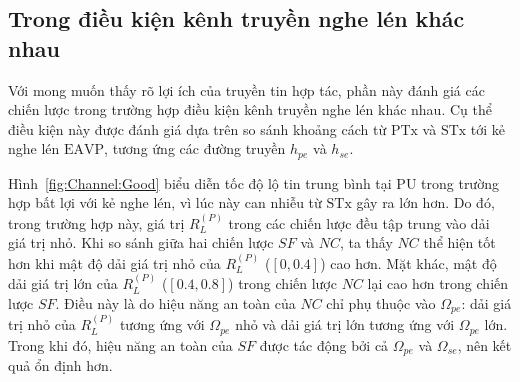 \documentclass[../main.tex]{subfiles}
\begin{document}
\subsection{Trong điều kiện kênh truyền nghe lén khác nhau}

Với mong muốn thấy rõ lợi ích của truyền tin hợp tác, phần này đánh giá các chiến lược trong trường hợp điều kiện kênh truyền nghe lén khác nhau. Cụ thể điều kiện này được đánh giá dựa trên so sánh khoảng cách từ $\text{PTx}$ và $\text{STx}$ tới kẻ nghe lén $\text{EAVP}$, tương ứng các đường truyền $h_{pe}$ và $h_{se}$. 

Hình~\ref{fig:Channel:Good} biểu diễn tốc độ lộ tin trung bình tại PU trong trường hợp bất lợi với kẻ nghe lén, vì lúc này can nhiễu từ $\text{STx}$ gây ra lớn hơn. Do đó, trong trường hợp này, giá trị $R_L^{(P)}$ trong các chiến lược đều tập trung vào dải giá trị nhỏ. Khi so sánh giữa hai chiến lược $SF$ và $NC$, ta thấy $NC$ thể hiện tốt hơn khi mật độ dải giá trị nhỏ của $R_L^{(P)}$ ($\left[0, 0.4\right]$) cao hơn. Mặt khác, mật độ dải giá trị lớn của $R_L^{(P)}$ ($\left[0.4, 0.8\right]$) trong chiến lược $NC$ lại cao hơn trong chiến lược $SF$. Điều này là do hiệu năng an toàn của $NC$ chỉ phụ thuộc vào $\Omega_{pe}$: dải giá trị nhỏ của $R_L^{(P)}$ tương ứng với $\Omega_{pe}$ nhỏ và dải giá trị lớn tương ứng với $\Omega_{pe}$ lớn. Trong khi đó, hiệu năng an toàn của $SF$ được tác động bởi cả $\Omega_{pe}$ và $\Omega_{se}$, nên kết quả ổn định hơn.
\end{document}
